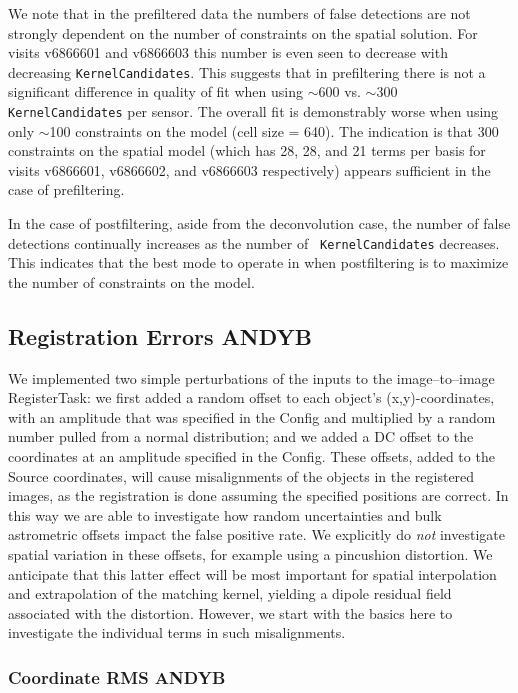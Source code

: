 \documentclass[prd, nofootinbib, floatfix, 11pt,tightenlines,times]{article}
\begin{document}
We note that in the prefiltered data the numbers of false detections
are not strongly dependent on the number of constraints on the spatial
solution.  For visits v6866601 and v6866603 this number is even seen
to decrease with decreasing {\tt KernelCandidates}.  This suggests
that in prefiltering there is not a significant difference in quality
of fit when using $\sim$600 vs. $\sim$300 {\tt KernelCandidates} per
sensor.  The overall fit is demonstrably worse when using only
$\sim$100 constraints on the model (cell size = 640).  The indication
is that 300 constraints on the spatial model (which has 28, 28, and 21
terms per basis for visits v6866601, v6866602, and v6866603
respectively) appears sufficient in the case of prefiltering.

In the case of postfiltering, aside from the deconvolution case, the
number of false detections continually increases as the number of {\tt
  KernelCandidates} decreases.  This indicates that the best mode to
operate in when postfiltering is to maximize the number of constraints
on the model.

\subsection{Registration Errors {\bf ANDYB}}

We implemented two simple perturbations of the inputs to the
image--to--image RegisterTask: we first added a random offset to each
object's (x,y)-coordinates, with an amplitude that was specified in
the Config and multiplied by a random number pulled from a normal
distribution; and we added a DC offset to the coordinates at an
amplitude specified in the Config.  These offsets, added to the Source
coordinates, will cause misalignments of the objects in the registered
images, as the registration is done assuming the specified positions
are correct.  In this way we are able to investigate how random
uncertainties and bulk astrometric offsets impact the false positive
rate.  We explicitly do {\it not} investigate spatial variation in
these offsets, for example using a pincushion distortion.  We
anticipate that this latter effect will be most important for spatial
interpolation and extrapolation of the matching kernel, yielding a
dipole residual field associated with the distortion.  However, we
start with the basics here to investigate the individual terms in such
misalignments.

\subsubsection{Coordinate RMS {\bf ANDYB}}
\end{document}

